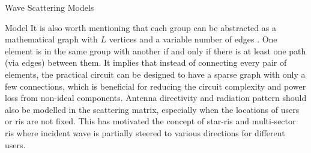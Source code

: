 \begin{section}{}
\begin{subsection}{Wave Scattering Models}
\begin{subsubsection}{ Model}
			It is also worth mentioning that each group can be abstracted as a mathematical graph with $L$ vertices and a variable number of edges \cite{Nerini2024}.
			One element is in the same group with another if and only if there is at least one path (via edges) between them.
			It implies that instead of connecting every pair of elements, the practical circuit can be designed to have a sparse graph with only a few connections, which is beneficial for reducing the circuit complexity and power loss from non-ideal components.
			Antenna directivity and radiation pattern should also be modelled in the scattering matrix, especially when the locations of users or \gls{ris} are not fixed.
			This has motivated the concept of \gls{star}-\gls{ris} \cite{Mu2021,Liu2021} and multi-sector \gls{ris} \cite{Li2023c} where incident wave is partially steered to various directions for different users.
		\end{subsubsection}
	\end{subsection}
\end{section}

